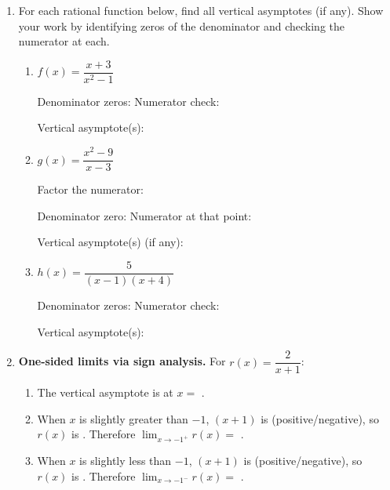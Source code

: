 \documentclass[10pt]{article}
\begin{document}
\namedateperiod

\vspace{0.12in}

\begin{enumerate}[itemsep=14pt]

\item For each rational function below, find all vertical asymptotes (if any). Show your work by
      identifying zeros of the denominator and checking the numerator at each.

\begin{enumerate}[label=(\alph*), itemsep=12pt]
  \item $f(x) = \dfrac{x + 3}{x^2 - 1}$

        Denominator zeros: \blank{4cm} \quad Numerator check: \blank{4cm}

        Vertical asymptote(s): \blank{4cm}

  \item $g(x) = \dfrac{x^2 - 9}{x - 3}$

        Factor the numerator: \blank{4cm}

        Denominator zero: \blank{2cm} \quad Numerator at that point: \blank{3cm}

        Vertical asymptote(s) (if any): \blank{4cm}

  \item $h(x) = \dfrac{5}{(x - 1)(x + 4)}$

        Denominator zeros: \blank{3.5cm} \quad Numerator check: \blank{3.5cm}

        Vertical asymptote(s): \blank{4cm}
\end{enumerate}

\item \textbf{One-sided limits via sign analysis.} For $r(x) = \dfrac{2}{x + 1}$:

\begin{enumerate}[label=(\alph*), itemsep=6pt]
  \item The vertical asymptote is at $x =$ \blank{1.5cm}.

  \item When $x$ is slightly greater than $-1$, $(x + 1)$ is \blank{2cm} (positive/negative),
        so $r(x)$ is \blank{2cm}. Therefore $\displaystyle\lim_{x \to -1^+} r(x) =$ \blank{2cm}.

  \item When $x$ is slightly less than $-1$, $(x + 1)$ is \blank{2cm} (positive/negative),
        so $r(x)$ is \blank{2cm}. Therefore $\displaystyle\lim_{x \to -1^-} r(x) =$ \blank{2cm}.
\end{enumerate}


\end{enumerate}
\end{document}
